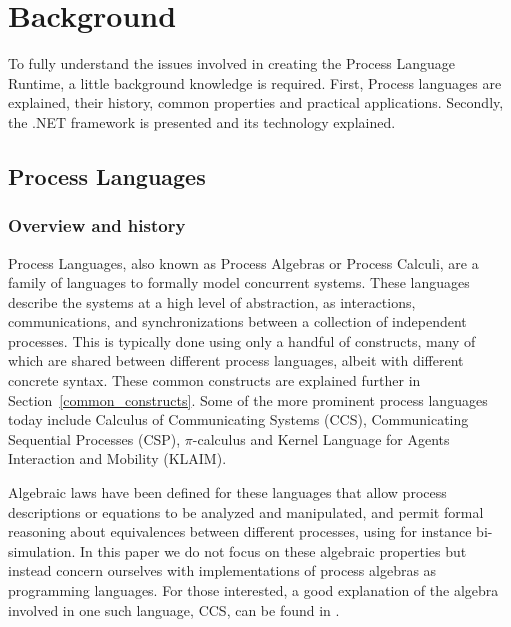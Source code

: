 \chapter{Background}

	To fully understand the issues involved in creating the Process Language 
	Runtime, a little background knowledge is required. First, Process 
	languages are explained, their history, common properties and practical 
	applications. Secondly, the .NET framework is presented and its technology
	explained.

\section{Process Languages}

\subsection{Overview and history}

	Process Languages, also known as Process Algebras or Process Calculi, are a
	family of languages to formally model concurrent systems. These languages 
	describe the systems at a high level of abstraction, as interactions, 
	communications, and synchronizations between a collection of independent
	processes. This is typically done using only a handful of constructs, many 
	of which are shared between different process languages, albeit 
	with different concrete syntax. These common constructs are explained 
	further in Section~\ref{common_constructs}. Some of the more prominent 
	process languages today include Calculus of Communicating Systems (CCS), 
	Communicating Sequential Processes (CSP), $\pi$-calculus and Kernel Language 
	for Agents Interaction and Mobility (KLAIM).
	
	Algebraic laws have been defined for these languages that allow process 
	descriptions or equations to be analyzed and manipulated, and permit formal 
	reasoning about equivalences between different processes, using for instance 
	bi-simulation. In this paper we do not focus on these algebraic properties 
	but instead concern ourselves with implementations of process algebras as 
	programming languages. For those interested, a good explanation of the 
	algebra involved in one such language, CCS, can be found in \cite{reactive}.
	
